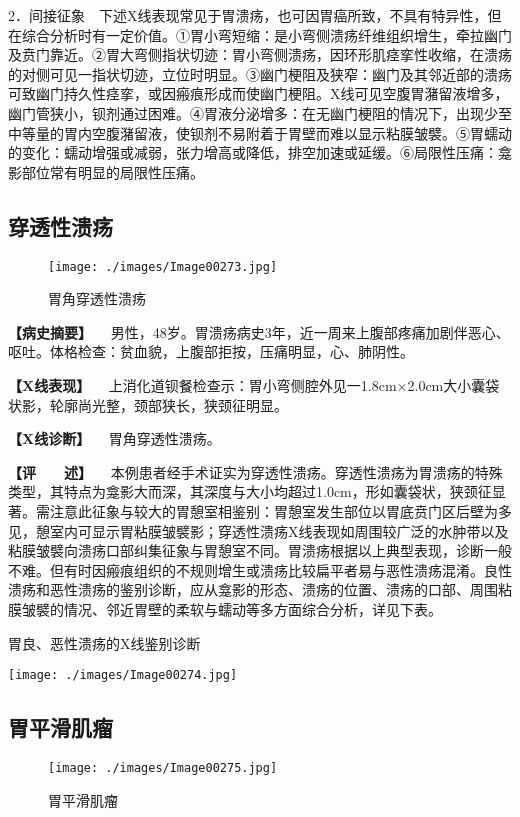 2．间接征象　下述X线表现常见于胃溃疡，也可因胃癌所致，不具有特异性，但在综合分析时有一定价值。①胃小弯短缩：是小弯侧溃疡纤维组织增生，牵拉幽门及贲门靠近。②胃大弯侧指状切迹：胃小弯侧溃疡，因环形肌痉挛性收缩，在溃疡的对侧可见一指状切迹，立位时明显。③幽门梗阻及狭窄：幽门及其邻近部的溃疡可致幽门持久性痉挛，或因瘢痕形成而使幽门梗阻。X线可见空腹胃潴留液增多，幽门管狭小，钡剂通过困难。④胃液分泌增多：在无幽门梗阻的情况下，出现少至中等量的胃内空腹潴留液，使钡剂不易附着于胃壁而难以显示粘膜皱襞。⑤胃蠕动的变化：蠕动增强或减弱，张力增高或降低，排空加速或延缓。⑥局限性压痛：龛影部位常有明显的局限性压痛。

\subsection{穿透性溃疡}

\begin{figure}[!htbp]
 \centering
 \texttt{[image: ./images/Image00273.jpg]}
 \captionsetup{justification=centering}
 \caption{胃角穿透性溃疡}
 \label{fig5-3-12}
  \end{figure} 

\textbf{【病史摘要】}
　男性，48岁。胃溃疡病史3年，近一周来上腹部疼痛加剧伴恶心、呕吐。体格检查：贫血貌，上腹部拒按，压痛明显，心、肺阴性。

\textbf{【X线表现】}
　上消化道钡餐检查示：胃小弯侧腔外见一1.8cm×2.0cm大小囊袋状影，轮廓尚光整，颈部狭长，狭颈征明显。

\textbf{【X线诊断】} 　胃角穿透性溃疡。

\textbf{【评　　述】}
　本例患者经手术证实为穿透性溃疡。穿透性溃疡为胃溃疡的特殊类型，其特点为龛影大而深，其深度与大小均超过1.0cm，形如囊袋状，狭颈征显著。需注意此征象与较大的胃憩室相鉴别：胃憩室发生部位以胃底贲门区后壁为多见，憩室内可显示胃粘膜皱襞影；穿透性溃疡X线表现如周围较广泛的水肿带以及粘膜皱襞向溃疡口部纠集征象与胃憩室不同。胃溃疡根据以上典型表现，诊断一般不难。但有时因瘢痕组织的不规则增生或溃疡比较扁平者易与恶性溃疡混淆。良性溃疡和恶性溃疡的鉴别诊断，应从龛影的形态、溃疡的位置、溃疡的口部、周围粘膜皱襞的情况、邻近胃壁的柔软与蠕动等多方面综合分析，详见下表。

胃良、恶性溃疡的X线鉴别诊断

\texttt{[image: ./images/Image00274.jpg]}

\subsection{胃平滑肌瘤}

\begin{figure}[!htbp]
 \centering
 \texttt{[image: ./images/Image00275.jpg]}
 \captionsetup{justification=centering}
 \caption{胃平滑肌瘤}
 \label{fig5-3-13}
  \end{figure} 

